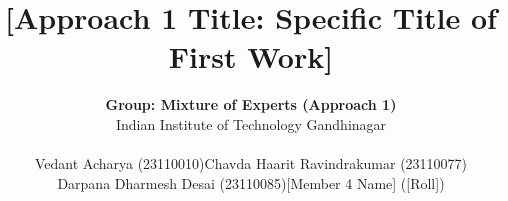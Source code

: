 \documentclass[11pt]{article}
\title{[Approach 1 Title: Specific Title of First Work]}
\author{
  \textbf{Group: Mixture of Experts (Approach 1)} \\[0.5ex]
  Indian Institute of Technology Gandhinagar \\[1ex]
  \begin{tabular}{cc}
    Vedant Acharya (23110010) & Chavda Haarit Ravindrakumar (23110077) \\
    Darpana Dharmesh Desai (23110085) & [Member 4 Name] ([Roll])
  \end{tabular}
}
\begin{document}
\maketitle









\nocite{*}

\end{document}
